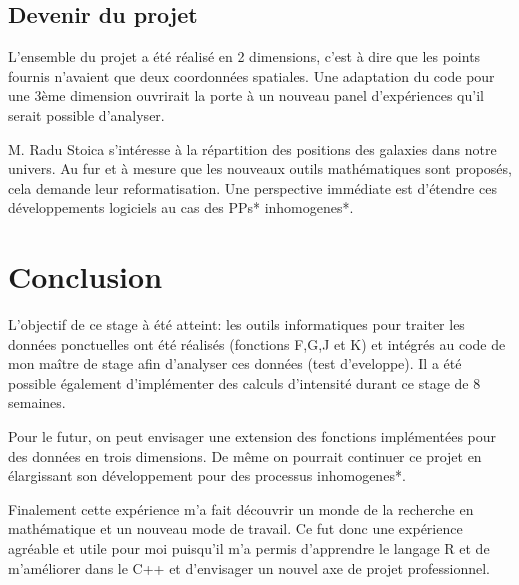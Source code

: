 \documentclass[stage2a]{tnreport}
\begin{document}
\section{Devenir du projet}

L'ensemble du projet a été réalisé en 2 dimensions, c'est à dire que les points fournis n'avaient que deux coordonnées spatiales. Une adaptation du code pour une 3ème dimension ouvrirait la porte à un nouveau panel d'expériences qu'il serait possible d'analyser.

M. Radu Stoica s'intéresse à la répartition des positions des galaxies dans notre univers. Au fur et à mesure que les nouveaux outils mathématiques sont proposés, cela demande leur reformatisation. Une perspective immédiate est d'étendre ces développements logiciels au cas des \gls{PP}s* in\gls{homogene}s*.


\chapter{Conclusion}


L'objectif de ce stage à été atteint: les outils informatiques pour traiter les données ponctuelles ont été réalisés (fonctions F,G,J et K) et intégrés au code de mon maître de stage afin d'analyser ces données (test d'eveloppe). Il a été possible également d'implémenter des calculs d'intensité durant ce stage de 8 semaines.

Pour le futur, on peut envisager une extension des fonctions implémentées pour des données en trois dimensions. De même on pourrait continuer ce projet en élargissant son développement pour des processus in\gls{homogene}s*.
 
Finalement cette expérience m'a fait découvrir un monde de la recherche en mathématique et un nouveau mode de travail. Ce fut donc une expérience agréable et utile pour moi puisqu'il m'a permis d'apprendre le langage R et de m'améliorer dans le C++ et d'envisager un nouvel axe de projet professionnel.

\cleardoublepage



\renewcommand{\tocbibname}{Bibliographie / Webographie}


\cleardoublepage

\listoffigures
\cleardoublepage
\end{document}
